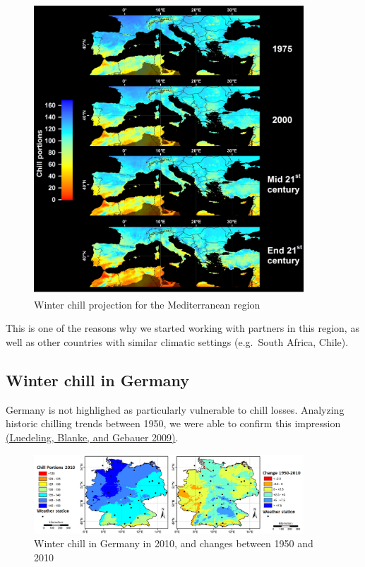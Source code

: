 \documentclass[
]{book}
\begin{document}
\begin{figure}
\centering
\includegraphics[width=0.9\textwidth,height=\textheight]{pictures/Figure_6_regional_grids_Mediterranean.jpg}
\caption{Winter chill projection for the Mediterranean region}
\end{figure}

This is one of the reasons why we started working with partners in this region, as well as other countries with similar climatic settings (e.g.~South Africa, Chile).

\hypertarget{winter-chill-in-germany}{%
\subsection{Winter chill in Germany}\label{winter-chill-in-germany}}

Germany is not highlighed as particularly vulnerable to chill losses. Analyzing historic chilling trends between 1950, we were able to confirm this impression \href{https://link.springer.com/article/10.1007/s10341-009-0085-4}{(Luedeling, Blanke, and Gebauer \protect\hyperlink{ref-luedeling_auswirkungen_2009}{2009})}.

\begin{figure}
\centering
\includegraphics[width=0.9\textwidth,height=\textheight]{pictures/Chilling_Germany.png}
\caption{Winter chill in Germany in 2010, and changes between 1950 and 2010}
\end{figure}
\end{document}
